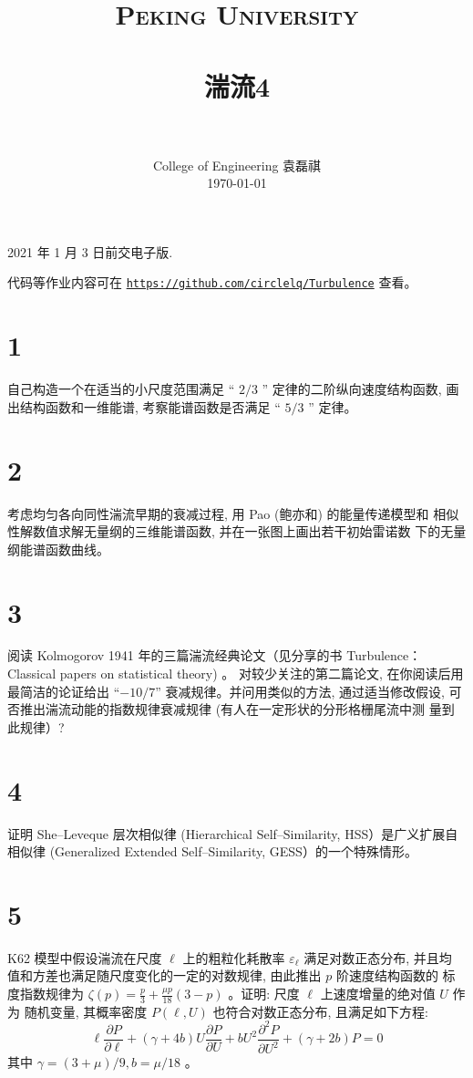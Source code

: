 \documentclass[12pt,a4]{ctexart}
\title{
   \vspace{-1in}
   \usefont{OT1}{bch}{b}{n}
   \normalfont \normalsize \textsc{\LARGE Peking University}\\[1cm] %
   \horrule{0.5pt} \\[0.5cm]
   \huge \bfseries{湍流4} \\
   \horrule{2pt} \\[0.5cm]
}
\author{
   \normalfont									\normalsize
   College of Engineering \quad 2001111690  \quad 袁磊祺\\	\normalsize
   \today
}
\date{}
\begin{document}


\maketitle

2021 年 1 月 3 日前交电子版.

代码等作业内容可在 \texttt{\href{https://github.com/circlelq/Turbulence}{https://github.com/circlelq/Turbulence}} 查看。


\section{1}

自己构造一个在适当的小尺度范围满足 “ $2 / 3$ ” 定律的二阶纵向速度结构函数, 画出结构函数和一维能谱, 考察能谱函数是否满足 “ $5 / 3$ ” 定律。


\section{2}

考虑均匀各向同性湍流早期的衰减过程, 用 Pao (鲍亦和) 的能量传递模型和 相似性解数值求解无量纲的三维能谱函数, 并在一张图上画出若干初始雷诺数 下的无量纲能谱函数曲线。


\section{3}

阅读 Kolmogorov 1941 年的三篇湍流经典论文（见分享的书 Turbulence： Classical papers on statistical theory) 。 对较少关注的第二篇论文, 在你阅读后用 最简洁的论证给出 “$-10/7$” 衰减规律。并问用类似的方法, 通过适当修改假设, 可否推出湍流动能的指数规律衰减规律 (有人在一定形状的分形格栅尾流中测 量到此规律）?


\section{4}

证明 She--Leveque 层次相似律 (Hierarchical Self--Similarity, HSS）是广义扩展自 相似律 (Generalized Extended Self--Similarity, GESS）的一个特殊情形。


\section{5}

K62 模型中假设湍流在尺度 $\ell$ 上的粗粒化耗散率 $\varepsilon_{\ell}$ 满足对数正态分布, 并且均
值和方差也满足随尺度变化的一定的对数规律, 由此推出 $p$ 阶速度结构函数的
标度指数规律为 $\zeta(p)=\frac{p}{3}+\frac{\mu p}{18}(3-p)$ 。证明: 尺度 $\ell$ 上速度增量的绝对值 $U$ 作为
随机变量, 其概率密度 $P(\ell, U)$ 也符合对数正态分布, 且满足如下方程:
\begin{equation}
   \ell \frac{\partial P}{\partial \ell}+(\gamma+4 b) U \frac{\partial P}{\partial U}+b U^{2} \frac{\partial^{2} P}{\partial U^{2}}+(\gamma+2 b) P=0
\end{equation}
其中 $\gamma=(3+\mu) / 9, b=\mu / 18$ 。
\end{document}
